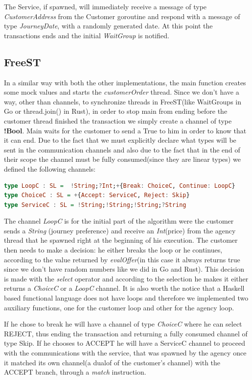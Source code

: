 \documentclass[runningheads]{llncs}
\begin{document}
The Service, if spawned, will immediately receive a message of type {\it CustomerAddress} from the Customer goroutine and respond with a message of type {\it JourneyDate}, with a randomly generated date. At this point the transactions ends and the initial {\it WaitGroup} is notified.
\subsection{FreeST}
In a similar way with both the other implementations, the main function creates some mock values and starts the {\it customerOrder} thread. Since we don't have a way, other than channels, to synchronize threads in FreeST(like WaitGroups in Go or thread.join() in Rust), in order to stop main from ending before the customer thread finished the transaction we simply create a channel of type {\bf !Bool}. Main waits for the customer to send a True to him in order to know that it can end.
Due to the fact that we must explicitly declare what types will be sent in the communication channels and also due to the fact that in the end of their scope the channel must be fully consumed(since they are linear types) we defined the following channels:
\begin{lstlisting}[language=haskell]
type LoopC : SL =  !String;?Int;+{Break: ChoiceC, Continue: LoopC}
type ChoiceC : SL = +{Accept: ServiceC, Reject: Skip}
type ServiceC : SL = !String;!String;!String;?String
\end{lstlisting}
The channel {\it LoopC} is for the initial part of the algorithm were the customer sends a {\it String} (journey preference) and receive an {\it Int}(price) from the agency thread that he spawned right at the beginning of his execution. The customer then needs to make a decision: he either breaks the loop or he continues, according to the value returned by {\it evalOffer}(in this case it always returns true since we don't have random numbers like we did in Go and Rust). This decision is made with the {\it select} operator and according to the selection he makes it either returns a {\it ChoiceC} or a {\it LoopC} channel. It is also worth the notice that a Haskell based functional language does not have loops and therefore we implemented two auxiliary functions, one for the customer loop and other for the agency loop.

If he chose to break he will have a channel of type {\it ChoiceC} where he can select REJECT, thus ending the transaction and returning a fully consumed channel of type Skip. If he chooses to ACCEPT he will have a ServiceC channel to proceed with the communications with the service, that was spawned by the agency once it matched its own channel(a dualof of the customer's channel) with the ACCEPT branch, through a {\it match} instruction.
\end{document}
